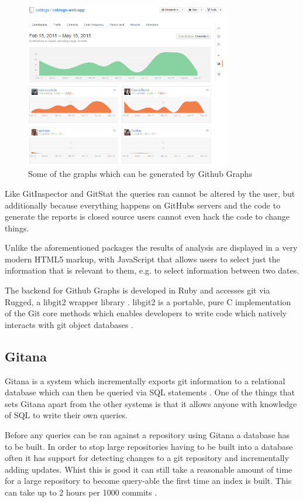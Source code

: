 \documentclass[11pt]{book}
\begin{document}
\begin{figure}[h]
	\centering
	\includegraphics[width=0.8\textwidth]{images/githubgraphs}
	\caption{Some of the graphs which can be generated by Github Graphs \cite{githubgraphs}}
	\label{fig:githubgraphs}
\end{figure} 

Like GitInspector and GitStat the queries ran cannot be altered by the user, but additionally because everything happens on GitHubs servers and the code to generate the reports is closed source users cannot even hack the code to change things.

Unlike the aforementioned packages the results of analysis are displayed in a very modern HTML5 markup, with JavaScript that allows users to select just the information that is relevant to them, e.g. to select information between two dates.

The backend for Github Graphs is developed in Ruby and accesses git via Rugged, a libgit2 wrapper library \cite{rugged}. libgit2 is a portable, pure C implementation of the Git core methods which enables developers to write code which natively interacts with git object databases \cite{libgit2}.

\subsection{Gitana}
Gitana is a system which incrementally exports git information to a relational database which can then be queried via SQL statements \cite{gitana}. One of the things that sets Gitana apart from the other systems is that it allows anyone with knowledge of SQL to write their own queries.

Before any queries can be ran against a repository using Gitana a database has to be built. In order to stop large repositories having to be built into a database often it has support for detecting changes to a git repository and incrementally adding updates. Whist this is good it can still take a reasonable amount of time for a large repository to become query-able the first time an index is built. This can take up to 2 hours per 1000 commits \cite{gitana}.
\end{document}
